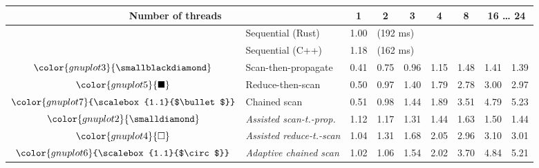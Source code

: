 \begin{tabular}{clrrrrrrr}
\toprule
\multicolumn{2}{c}{\textbf{Number of threads}} & \multicolumn{1}{c}{\textbf{ 1 }} & \multicolumn{1}{c}{\textbf{ 2 }} & \multicolumn{1}{c}{\textbf{ 3 }} & \multicolumn{1}{c}{\textbf{ 4 }} & \multicolumn{1}{c}{\textbf{ 8 }} & \multicolumn{2}{c}{\textbf{ 16 } \dots \textbf{ 24 }} \\
\midrule
& Sequential (Rust) & \multicolumn{1}{r}{ 1.00 } & \multicolumn{ 6 }{l}{(192 ms)} \\
& Sequential (C++) & \multicolumn{1}{r}{ 1.18 } & \multicolumn{ 6 }{l}{(162 ms)} \\
\rowcolor{gnuplot3!10}$\color{gnuplot3}{\smallblackdiamond}$ & Scan-then-propagate & \cellcolor{gnuplot3!10} 0.41 & \cellcolor{gnuplot3!10} 0.75 & \cellcolor{gnuplot3!10} 0.96 & \cellcolor{gnuplot3!10} 1.15 & \cellcolor{gnuplot3!10} 1.48 & \cellcolor{gnuplot3!10} 1.41 & \cellcolor{gnuplot3!10} 1.39 \\
\rowcolor{gnuplot5!10}$\color{gnuplot5}{\blacksquare}$ & Reduce-then-scan & \cellcolor{gnuplot5!10} 0.50 & \cellcolor{gnuplot5!10} 0.97 & \cellcolor{gnuplot5!10} 1.40 & \cellcolor{gnuplot5!10} 1.79 & \cellcolor{gnuplot5!10} 2.78 & \cellcolor{gnuplot5!10} 3.00 & \cellcolor{gnuplot5!10} 2.97 \\
\rowcolor{gnuplot7!10}$\color{gnuplot7}{\scalebox{1.1}{$\bullet$}}$ & Chained scan & \cellcolor{gnuplot7!10} 0.51 & \cellcolor{gnuplot7!10} 0.98 & \cellcolor{gnuplot7!10} 1.44 & \cellcolor{gnuplot7!10} 1.89 & \cellcolor{gnuplot7!10} 3.51 & \cellcolor{gnuplot7!10} 4.79 & \cellcolor{gnuplot7!10} 5.23 \\
\rowcolor{gnuplot2!30}$\color{gnuplot2}{\smalldiamond}$ & \textit{Assisted scan-t.-prop.} & \cellcolor{gnuplot2!30} 1.12 & \cellcolor{gnuplot2!30} 1.17 & \cellcolor{gnuplot2!30} 1.31 & \cellcolor{gnuplot2!30} 1.44 & \cellcolor{gnuplot2!30} 1.63 & \cellcolor{gnuplot2!30} 1.50 & \cellcolor{gnuplot2!30} 1.44 \\
\rowcolor{gnuplot4!30}$\color{gnuplot4}{\square}$ & \textit{Assisted reduce-t.-scan} & \cellcolor{gnuplot4!30} 1.04 & \cellcolor{gnuplot4!30} 1.31 & \cellcolor{gnuplot4!30} 1.68 & \cellcolor{gnuplot4!30} 2.05 & \cellcolor{gnuplot4!30} 2.96 & \cellcolor{gnuplot4!30} 3.10 & \cellcolor{gnuplot4!30} 3.01 \\
\rowcolor{gnuplot6!30}$\color{gnuplot6}{\scalebox{1.1}{$\circ$}}$ & \textit{Adaptive chained scan} & \cellcolor{gnuplot6!30} 1.02 & \cellcolor{gnuplot6!30} 1.06 & \cellcolor{gnuplot6!30} 1.54 & \cellcolor{gnuplot6!30} 2.02 & \cellcolor{gnuplot6!30} 3.70 & \cellcolor{gnuplot6!30} 4.84 & \cellcolor{gnuplot6!30} 5.21 \\

\end{tabular}
